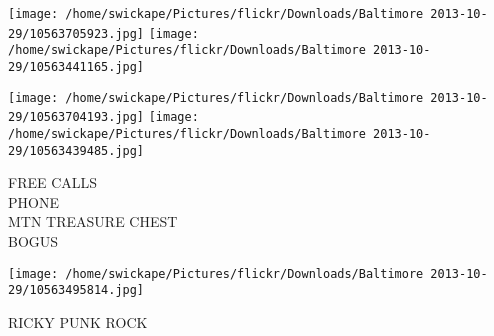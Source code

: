 \documentclass[10pt,letterpaper]{article}
\begin{document}
\texttt{[image: /home/swickape/Pictures/flickr/Downloads/Baltimore 2013-10-29/10563705923.jpg]}
\texttt{[image: /home/swickape/Pictures/flickr/Downloads/Baltimore 2013-10-29/10563441165.jpg]}

\texttt{[image: /home/swickape/Pictures/flickr/Downloads/Baltimore 2013-10-29/10563704193.jpg]}
\texttt{[image: /home/swickape/Pictures/flickr/Downloads/Baltimore 2013-10-29/10563439485.jpg]}

FREE CALLS\\
PHONE\\
MTN TREASURE CHEST\\
BOGUS\\
\pagebreak

\texttt{[image: /home/swickape/Pictures/flickr/Downloads/Baltimore 2013-10-29/10563495814.jpg]}

RICKY PUNK ROCK\\
\pagebreak
\end{document}
